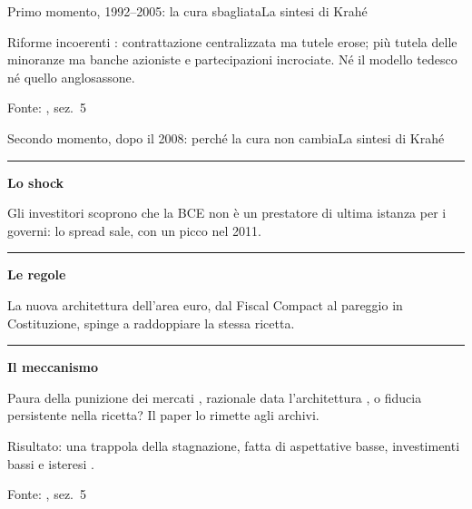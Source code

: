 \documentclass[aspectratio=169,10pt]{beamer}
\newcommand{\fonte}[1]{\vfill{\tiny\color{muted}#1\par}}
\newcommand{\nota}[1]{{\setlength{\fboxsep}{7pt}\colorbox{paper2}{\parbox{\dimexpr\linewidth-14pt}{\small\raggedright #1}}}}
\newcommand{\riga}[2]{{\color{rulegray}\rule{\linewidth}{0.5pt}}\par\vspace{0.1em}%
  \begin{minipage}[t]{0.25\linewidth}\raggedright\small\leavevmode\color{ink}\bfseries #1\end{minipage}\hfill
  \begin{minipage}[t]{0.72\linewidth}\raggedright\small #2\end{minipage}\par\vspace{0.35em}}
\newcommand{\passo}[2]{\parbox[t][2.1cm][t]{0.19\textwidth}{\raggedright\small{\color{ink}\bfseries #1}\\[0.3em]#2}}
\begin{document}
\begin{frame}{Primo momento, 1992–2005: la cura sbagliata}{La sintesi di Krahé}
  \vspace{0.6em}
  \vfill
  \nota{Riforme incoerenti \citep{simoni2020}: contrattazione centralizzata ma tutele erose; più tutela delle minoranze ma banche azioniste e partecipazioni incrociate. Né il modello tedesco né quello anglosassone.}
  \fonte{Fonte: \citet{krahe2023}, sez.~5}
\end{frame}

\begin{frame}{Secondo momento, dopo il 2008: perché la cura non cambia}{La sintesi di Krahé}
  \vspace{0.4em}
  \riga{Lo shock}{Gli investitori scoprono che la BCE non è un prestatore di ultima istanza per i governi: lo spread sale, con un picco nel 2011.}
  \riga{Le regole}{La nuova architettura dell’area euro, dal Fiscal Compact al pareggio in Costituzione, spinge a raddoppiare la stessa ricetta.}
  \riga{Il meccanismo}{Paura della punizione dei mercati \citep{moschella2017}, razionale data l’architettura \citep{degrauwe2013}, o fiducia persistente nella ricetta? Il paper lo rimette agli archivi.}
  \vfill
  \nota{Risultato: una trappola della stagnazione, fatta di aspettative basse, investimenti bassi e isteresi \citep{benigno2018}.}
  \fonte{Fonte: \citet{krahe2023}, sez.~5}
\end{frame}
\end{document}
